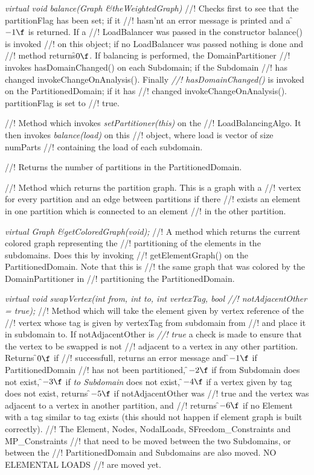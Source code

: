 {\em virtual void balance(Graph \&theWeightedGraph)}
//! Checks first to see that the \p partitionFlag has been set; if it
//! hasn'nt an error message is printed and a \f$-1\f$ is returned. If a
//! LoadBalancer was passed in the constructor balance() is invoked
//! on this object; if no LoadBalancer was passed nothing is done and
//! method returns\f$0\f$. If balancing is performed, the DomainPartitioner
//! invokes hasDomainChanged() on each Subdomain; if the Subdomain
//! has changed invokeChangeOnAnalysis(). Finally {\em
//! hasDomainChanged()} is invoked on the PartitionedDomain; if it has
//! changed invokeChangeOnAnalysis(). \p partitionFlag is set to
//! true. 

//! Method which invokes {\em setPartitioner(this)} on the
//! LoadBalancingAlgo. It then invokes {\em balance(load)} on this
//! object, where \p load is vector of size \p numParts
//! containing the load of each subdomain. 

//! Returns the number of partitions in the PartitionedDomain.

//! Method which returns the partition graph. This is a graph with a
//! vertex for every partition and an edge between partitions if there
//! exists an element in one partition which is connected to an element
//! in the other partition.

{\em virtual Graph \&getColoredGraph(void); }
//! A method which returns the current colored graph representing the
//! partitioning of the elements in the subdomains. Does this by invoking
//! getElementGraph() on the PartitionedDomain. Note that this is
//! the same graph that was colored by the DomainPartitioner in
//! partitioning the PartitionedDomain. 

{\em virtual void swapVertex(int from, int to, int vertexTag, bool
//! notAdjacentOther = true); } 
//! Method which will take the element given by vertex reference of the
//! vertex whose tag is given by \p vertexTag from subdomain \p from
//! and place it in subdomain \p to. If \p notAdjacentOther is {\em
//! true} a check is made to ensure that the vertex to be swapped is not
//! adjacent to a vertex in any other partition. Returns \f$0\f$ if
//! successfull, returns an error message and \f$-1\f$ if PartitionedDomain
//! has not been partitioned, \f$-2\f$ if \p from Subdomain does not exist,
\f$-3\f$ if {\em to Subdomain} does not exist, \f$-4\f$ if a vertex given by
\p tag does not exist, returns \f$-5\f$ if \p notAdjacentOther was
//! true and the vertex was adjacent to a vertex in another partition, and
//! returns \f$-6\f$ if no Element with a tag similar to \p tag exists
(this should not happen if element graph is built correctly).
//! The Element, Nodes, NodalLoads, SFreedom\_Constraints and MP\_Constraints
//! that need to be moved between the two Subdomains, or between the
//! PartitionedDomain and Subdomains are also moved. NO ELEMENTAL LOADS 
//! are moved yet.


